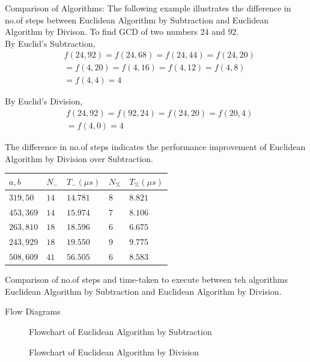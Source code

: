 \documentclass[8pt]{beamer}
\begin{document}
\begin{frame}[allowframebreaks]{Comparison of Algorithms:}
The following example illustrates the difference in no.of steps between Euclidean Algorithm by Subtraction and Euclidean Algorithm by Divison. To find GCD of two numbers $24$ and $92$.\\

By Euclid's Subtraction,
\[
\begin{split}
&f(24,92) = f(24,68) = f(24,44) = f(24,20)\\
&= f(4,20) = f(4,16) = f(4,12) = f(4,8)\\
&= f(4,4) = 4
\end{split}\]

By Euclid's Division,
\[
\begin{split}
&f(24,92) = f(92,24) = f(24,20) = f(20,4)\\
&= f(4,0) = 4
\end{split}\]

The difference in no.of steps indicates the performance improvement of Euclidean Algorithm by Division over Subtraction.

\begin{center}
    \begin{tabular}{ | m{5em} | m{5em} | m{5em} | m{5em} | m{5em} | } 
	\hline
	$a,b$ & $N_{-}$ & $T_{-}(\mu s)$ & $N_{\%}$ & $T_{\%}(\mu s)$ \\ 
	\hline
	$319,50$ & $14$ & $14.781$ & $8$ & $8.821$ \\ 
	\hline
	$453,369$ & $14$ & $15.974$ & $7$ & $8.106$ \\ 
	\hline
	$263,810$ & $18$ & $18.596$ & $6$ & $6.675$ \\ 
	\hline
	$243,929$ & $18$ & $19.550$ & $9$ & $9.775$ \\ 
	\hline
	$508,609$ & $41$ & $56.505$ & $6$ & $8.583$ \\ 
	\hline
    \end{tabular}
\end{center}
Comparison of no.of steps and time-taken to execute between teh algorithms Euclidean Algorithm by Subtraction and Euclidean Algorithm by Division. 
\end{frame}

\begin{frame}[allowframebreaks]{Flow Diagrams}
\begin{figure}[h!]
	\begin{center}
		\resizebox{4.25cm}{!}{}
	\end{center}
	\caption{Flowchart of Euclidean Algorithm by Subtraction}
	\label{fig:Input}
\end{figure}
\begin{figure}[h!]
	\begin{center}
		\resizebox{4.25cm}{!}{}
	\end{center}
	\caption{Flowchart of Euclidean Algorithm by Division}
	\label{fig:Input}
\end{figure}
\end{frame}
\end{document}
